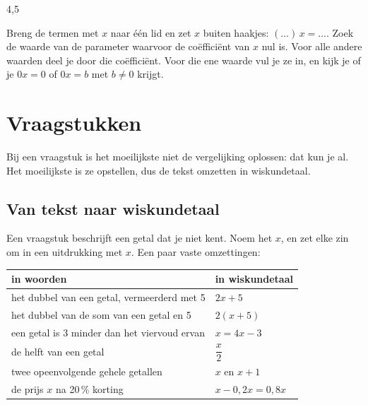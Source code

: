 \begin{alleenvoor}{4,5}
\begin{werkwijze}
Breng de termen met $x$ naar één lid en zet $x$ buiten haakjes: $(\ldots)\,x = \ldots$. Zoek de waarde van de parameter waarvoor de coëfficiënt van $x$ nul is. Voor alle andere waarden deel je door die coëfficiënt. Voor die ene waarde vul je ze in, en kijk je of je $0x = 0$ of $0x = b$ met $b \neq 0$ krijgt.
\end{werkwijze}

\begin{oefeningen}
\end{oefeningen}
\end{alleenvoor}

\section{Vraagstukken}

Bij een vraagstuk is het moeilijkste niet de vergelijking oplossen: dat kun je al. Het moeilijkste is ze opstellen, dus de tekst omzetten in wiskundetaal.

\subsection{Van tekst naar wiskundetaal}

Een vraagstuk beschrijft een getal dat je niet kent. Noem het $x$, en zet elke zin om in een uitdrukking met $x$. Een paar vaste omzettingen:

\begin{center}\renewcommand{\arraystretch}{1.5}%
\begin{tabular}{|>{\centering\arraybackslash}m{7.2cm}|>{\centering\arraybackslash}m{4cm}|}
\hline
\textbf{in woorden} & \textbf{in wiskundetaal} \\ \hline
het dubbel van een getal, vermeerderd met 5 & $2x + 5$ \\ \hline
het dubbel van de som van een getal en 5 & $2(x + 5)$ \\ \hline
een getal is 3 minder dan het viervoud ervan & $x = 4x - 3$ \\ \hline
de helft van een getal & $\dfrac x2$ \\ \hline
twee opeenvolgende gehele getallen & $x$ en $x + 1$ \\ \hline
de prijs $x$ na 20\,\% korting & $x - 0{,}2x = 0{,}8x$ \\ \hline
\end{tabular}\end{center}

